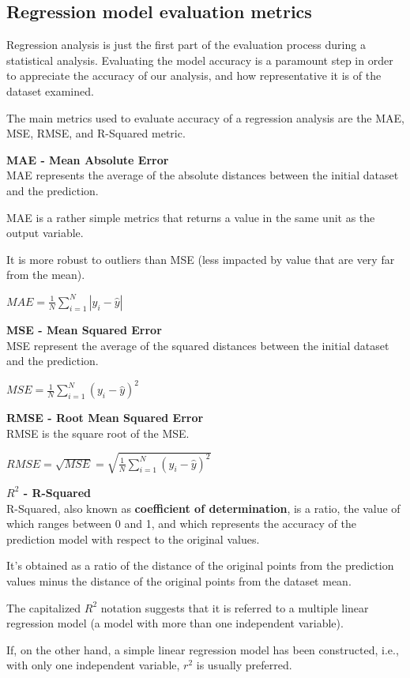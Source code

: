 \documentclass{article}
\begin{document}
\subsection{Regression model evaluation metrics}
Regression analysis is just the first part of the evaluation process during a statistical analysis. Evaluating the model accuracy is a paramount step in order to appreciate the accuracy of our analysis, and how representative it is of the dataset examined.

The main metrics used to evaluate accuracy of a regression analysis are the MAE, MSE, RMSE, and R-Squared metric.

\textbf{MAE - Mean Absolute Error} \\ 
MAE represents the average of the absolute distances between the initial dataset and the prediction.

MAE is a rather simple metrics that returns a value in the same unit as the output variable. 

It is more robust to outliers than MSE (less impacted by value that are very far from the mean).

$ \displaystyle MAE = \frac{1}{N} \sum^{N}_{i=1}{|y_i - \hat{y}|} $

\textbf{MSE - Mean Squared Error} \\
MSE represent the average of the squared distances between the initial dataset and the prediction.

$ \displaystyle MSE = \frac{1}{N} \sum^{N}_{i=1}{(y_i - \hat{y})^2} $

\textbf{RMSE - Root Mean Squared Error} \\
RMSE is the square root of the MSE.

$ \displaystyle RMSE = \sqrt{MSE} = \sqrt{\frac{1}{N} \sum^{N}_{i=1}{(y_i - \hat{y})^2}} $

\textbf{$R^2$ - R-Squared} \\
R-Squared, also known as \textbf{coefficient of determination}, is a ratio, the value of which ranges between 0 and 1, and which represents the accuracy of the prediction model with respect to the original values. 

It's obtained as a ratio of the distance of the original points from the prediction values minus the distance of the original points from the dataset mean. 

The capitalized $R^2$ notation suggests that it is referred to a multiple linear regression model (a model with more than one independent variable).

If, on the other hand, a simple linear regression model has been constructed, i.e., with only one independent variable, $r^2$ is usually preferred.
\end{document}
